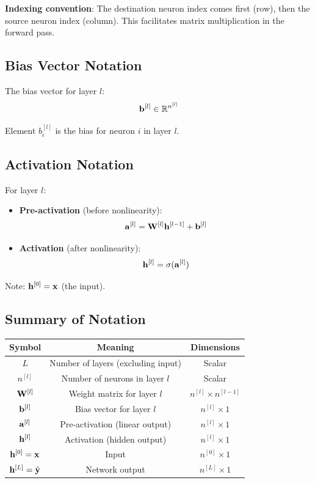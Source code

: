 \textbf{Indexing convention}: The destination neuron index comes first (row), then the source neuron index (column). This facilitates matrix multiplication in the forward pass.

\subsection{Bias Vector Notation}

\begin{definitionbox}
The bias vector for layer $l$:
\[
\mathbf{b}^{[l]} \in \mathbb{R}^{n^{[l]}}
\]

Element $b_i^{[l]}$ is the bias for neuron $i$ in layer $l$.
\end{definitionbox}

\subsection{Activation Notation}

\begin{definitionbox}
For layer $l$:
\begin{itemize}
    \item \textbf{Pre-activation} (before nonlinearity):
    \[
    \mathbf{a}^{[l]} = \mathbf{W}^{[l]} \mathbf{h}^{[l-1]} + \mathbf{b}^{[l]}
    \]
    
    \item \textbf{Activation} (after nonlinearity):
    \[
    \mathbf{h}^{[l]} = \sigma(\mathbf{a}^{[l]})
    \]
\end{itemize}

Note: $\mathbf{h}^{[0]} = \mathbf{x}$ (the input).
\end{definitionbox}

\subsection{Summary of Notation}

\begin{center}
\renewcommand{\arraystretch}{1.3}
\begin{tabular}{|c|c|c|}
\hline
\textbf{Symbol} & \textbf{Meaning} & \textbf{Dimensions} \\ \hline
$L$ & Number of layers (excluding input) & Scalar \\ \hline
$n^{[l]}$ & Number of neurons in layer $l$ & Scalar \\ \hline
$\mathbf{W}^{[l]}$ & Weight matrix for layer $l$ & $n^{[l]} \times n^{[l-1]}$ \\ \hline
$\mathbf{b}^{[l]}$ & Bias vector for layer $l$ & $n^{[l]} \times 1$ \\ \hline
$\mathbf{a}^{[l]}$ & Pre-activation (linear output) & $n^{[l]} \times 1$ \\ \hline
$\mathbf{h}^{[l]}$ & Activation (hidden output) & $n^{[l]} \times 1$ \\ \hline
$\mathbf{h}^{[0]} = \mathbf{x}$ & Input & $n^{[0]} \times 1$ \\ \hline
$\mathbf{h}^{[L]} = \hat{\mathbf{y}}$ & Network output & $n^{[L]} \times 1$ \\ \hline
\end{tabular}
\end{center}

